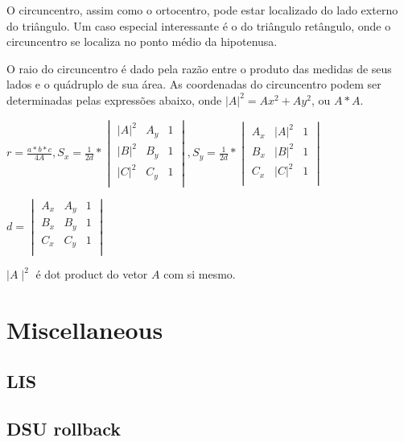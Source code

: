 \documentclass[a4paper,10pt,oneside]{article}
\newcommand\includes[2]{
   \subsection{#1}
   
}
\begin{document}
\begin{multicols}{2}
O circuncentro, assim como o ortocentro, pode estar localizado do lado externo do triângulo. Um caso especial interessante é o do triângulo retângulo, onde o circuncentro se localiza no ponto médio da hipotenusa.

O raio do circuncentro é dado pela razão entre o produto das medidas de seus lados e o quádruplo de sua área. As coordenadas do circuncentro podem ser determinadas pelas expressões abaixo, onde $|A|^2 = Ax^2 + Ay^2$, ou $A*A$.

$r = \frac{a*b*c}{4A}, S_x = \frac{1}{2d} * \begin{vmatrix}
|A|^2 & A_y & 1 \\
|B|^2 & B_y & 1 \\
|C|^2 & C_y & 1 \\
\end{vmatrix}, S_y = \frac{1}{2d} * \begin{vmatrix}
A_x & |A|^2 & 1 \\
B_x & |B|^2 & 1 \\
C_x & |C|^2 & 1 \\
\end{vmatrix}$

$d = \begin{vmatrix}
A_x & A_y & 1 \\
B_x & B_y & 1 \\
C_x & C_y & 1 \\
\end{vmatrix}$

$\mid A\mid^2$ é dot product do vetor $A$ com si mesmo.

\section{Miscellaneous}
\includes{LIS}{code/misc/lis.cpp}
\includes{DSU rollback}{code/misc/bipar.cpp}

\end{multicols}
\end{document}
